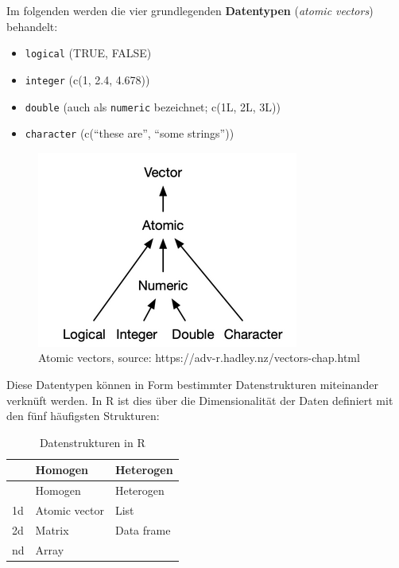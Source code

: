 \documentclass[
]{article}
\providecommand{\tightlist}{%
  \setlength{\itemsep}{0pt}\setlength{\parskip}{0pt}}
\begin{document}
Im folgenden werden die vier grundlegenden \textbf{Datentypen} (\emph{atomic vectors}) behandelt:

\begin{itemize}
\tightlist
\item
  \texttt{logical} (TRUE, FALSE)
\item
  \texttt{integer} (c(1, 2.4, 4.678))
\item
  \texttt{double} (auch als \texttt{numeric} bezeichnet; c(1L, 2L, 3L))
\item
  \texttt{character} (c(``these are'', ``some strings''))
\end{itemize}

\begin{figure}

{\centering \includegraphics[width=1\linewidth]{images/079} 

}

\caption{Atomic vectors, source: https://adv-r.hadley.nz/vectors-chap.html}\label{fig:unnamed-chunk-41}
\end{figure}

Diese Datentypen können in Form bestimmter Datenstrukturen miteinander verknüft werden. In R ist dies über die Dimensionalität der Daten definiert mit den fünf häufigsten Strukturen:

\begin{longtable}[]{@{}lll@{}}
\caption{Datenstrukturen in R}\tabularnewline
\toprule
& Homogen & Heterogen \\
\midrule
\endfirsthead
\toprule
& Homogen & Heterogen \\
\midrule
\endhead
1d & Atomic vector & List \\
2d & Matrix & Data frame \\
nd & Array & \\
\bottomrule
\end{longtable}
\end{document}
